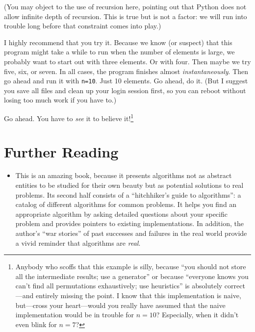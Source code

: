 (You may object to the use of recursion here, pointing out that Python
does not allow infinite depth of recursion. This is true but is not a
factor: we will run into trouble long before that constraint comes
into play.)

I highly recommend that you try it. Because we know (or suspect) that
this program might take a while to run when the number of elements is
large, we probably want to start out with three elements. Or with
four.  Then maybe we try five, six, or seven. In all cases, the
program finishes almost \emph{instantaneously}. Then go ahead and run
it with \texttt{n=10}.  Just 10 elements. Go ahead, do it. (But I
suggest you save all files and clean up your login session first, so
you can reboot without losing too much work if you have to.)

Go ahead. You have to \emph{see} it to believe it!\footnote{Anybody
  who scoffs that this example is silly, because ``you should not
  store all the intermediate results; use a generator'' or because
  ``everyone knows you can't find all permutations exhaustively; use
  heuristics'' is absolutely correct---and entirely missing the point.
  I know that this implementation is naive, but---cross your
  heart---would you really have assumed that the naive implementation
  would be in trouble for $n=10$? Especially, when it didn't even
  blink for $n=7$?}

\section{Further Reading}



\begin{itemize}
\item {} This is an amazing book, because it presents
  algorithms not as abstract entities to be studied for their own
  beauty but as potential solutions to real problems. Its second half
  consists of a ``hitchhiker's guide to algorithms'': a catalog of
  different algorithms for common problems.  It helps you find an
  appropriate algorithm by asking detailed questions about your
  specific problem and provides pointers to existing implementations.
  In addition, the author's ``war stories'' of past successes and
  failures in the real world provide a vivid reminder that algorithms
  are \emph{real}.
\end{itemize}
